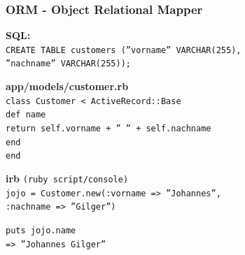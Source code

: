 \begin{frame}
  \frametitle{ORM - Object Relational Mapper}
  {\bf \small SQL:} \\
  {\tt \small CREATE TABLE customers (''vorname'' VARCHAR(255),} \\
  {\tt \small \enskip ''nachname'' VARCHAR(255));} \\
  \vspace{0.3cm}
  \pause
  
  {\bf \small app/models/customer.rb} \\
  {\tt \small class Customer < ActiveRecord::Base} \\
  {\tt \small \enskip def name} \\
  {\tt \small \enskip \enskip return self.vorname + '' '' + self.nachname} \\
  {\tt \small \enskip end} \\
  {\tt \small end} \\
  \vspace{0.3cm}
  \pause

  {\bf \small irb} {\small \tt (ruby script/console)} \\
  {\tt \small jojo = Customer.new(:vorname => ''Johannes'',} \\
  {\tt \small \enskip :nachname => ''Gilger'')} \\
  \vspace{0.3cm}
  \pause

  {\tt \small puts jojo.name} \\
  {\tt \small {\color{green}=> ''Johannes Gilger''}}
\end{frame}

